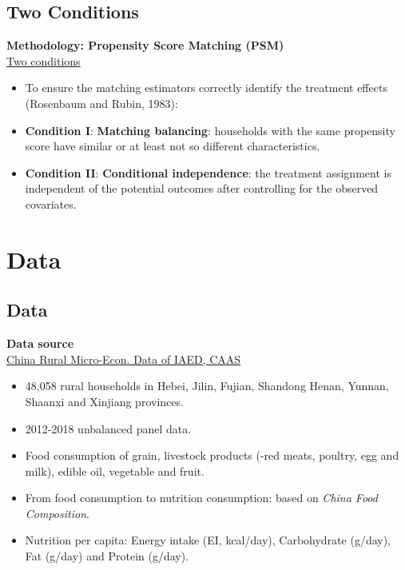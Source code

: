 \documentclass{beamer}	%
\theoremstyle{plain}
\theoremstyle{definition}
\theoremstyle{remark}
\numberwithin{equation}{section}
\begin{document}
\subsection {Two Conditions}
\begin{frame}
	\textbf{Methodology: Propensity Score Matching (PSM)} \\
	\underline{Two conditions} \\
	\begin{itemize}
		\item To ensure the matching estimators correctly identify the treatment effects (Rosenbaum and Rubin, 1983): 
		\item \textbf{Condition I}: \textbf{Matching balancing}: households with the same propensity score have similar or at least not so different characteristics. 
		\item \textbf{Condition II}: \textbf{Conditional independence}: the treatment assignment is independent of the potential outcomes after controlling for the observed covariates.
	\end{itemize}
\end{frame}

\section{Data}

\subsection {Data}
\begin{frame}
	\textbf{Data source} \\
	\underline{China Rural Micro-Econ. Data of IAED, CAAS}
	\begin{itemize}
		\item 48,058 rural households in Hebei, Jilin, Fujian, Shandong Henan, Yunnan, Shaanxi and Xinjiang provinces.
		\item 2012-2018 unbalanced panel data.
		\item Food consumption of grain, livestock products (-red meats, poultry, egg and milk), edible oil, vegetable and fruit.
		\item From food consumption to nutrition consumption: based on \emph{China Food Composition}.
		\item Nutrition per capita: Energy intake (EI, kcal/day), Carbohydrate (g/day), Fat (g/day) and Protein (g/day).
\end{itemize}
\end{frame}
\end{document}

